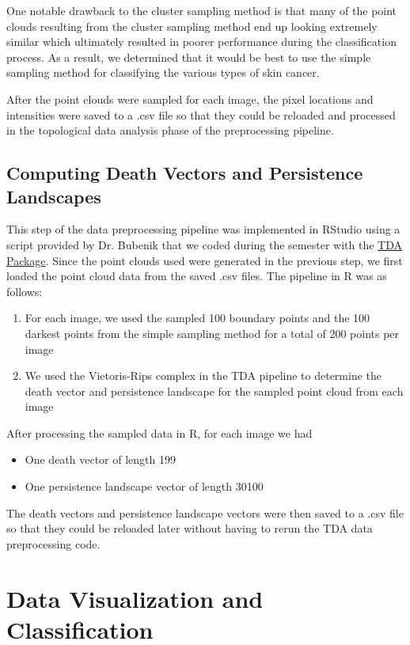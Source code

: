 \documentclass[11pt, reqno]{amsart}
\theoremstyle{plain}
\theoremstyle{definition}
\begin{document}
One notable drawback to the cluster sampling method is that many of the point clouds resulting from the cluster sampling method end up looking extremely similar which ultimately resulted in poorer performance during the classification process. As a result, we determined that it would be best to use the simple sampling method for classifying the various types of skin cancer. 

After the point clouds were sampled for each image, the pixel locations and intensities were saved to a .csv file so that they could be reloaded and processed in the topological data analysis phase of the preprocessing pipeline.

\subsection{Computing Death Vectors and Persistence Landscapes}

This step of the data preprocessing pipeline was implemented in RStudio using a script provided by Dr. Bubenik that we coded during the semester with the \href{https://cran.r-project.org/web/packages/TDA/index.html}{TDA Package}. Since the point clouds used were generated in the previous step, we first loaded the point cloud data from the saved .csv files. The pipeline in R was as follows:
\begin{enumerate}
    \item For each image, we used the sampled 100 boundary points and the 100 darkest points from the simple sampling method for a total of 200 points per image
    \item We used the Vietoris-Rips complex in the TDA pipeline to determine the death vector and persistence landscape for the sampled point cloud from each image
\end{enumerate}

After processing the sampled data in R, for each image we had
\begin{itemize}
    \item One death vector of length 199
    \item One persistence landscape vector of length 30100
\end{itemize}
The death vectors and persistence landscape vectors were then saved to a .csv file so that they could be reloaded later without having to rerun the TDA data preprocessing code. 

\section{Data Visualization and Classification}
\end{document}
